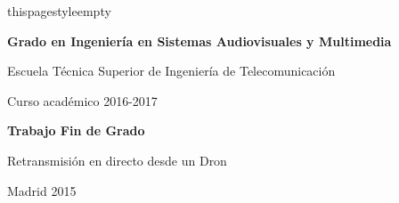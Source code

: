 thispagestyle{empty}

\vspace{2cm}

\begin{figure}[htb]
\centerline{}
\end{figure}

\vspace{8mm}
\begin{center}
{\Large {\bf Grado en Ingeniería en Sistemas Audiovisuales y Multimedia}}
\vspace{8mm}

{\large Escuela Técnica Superior de Ingeniería de Telecomunicación}
\vspace{8mm}

{\large Curso académico 2016-2017}

\vspace{1.0cm}

{\large {\bf Trabajo Fin de Grado}} 

\vspace{2cm}
{\Huge {Retransmisión en directo desde un Dron}}

\end{center}

\vspace{4cm}

\vspace{0.5cm}
\begin{center}
\large{Madrid 2015}
\end{center}
